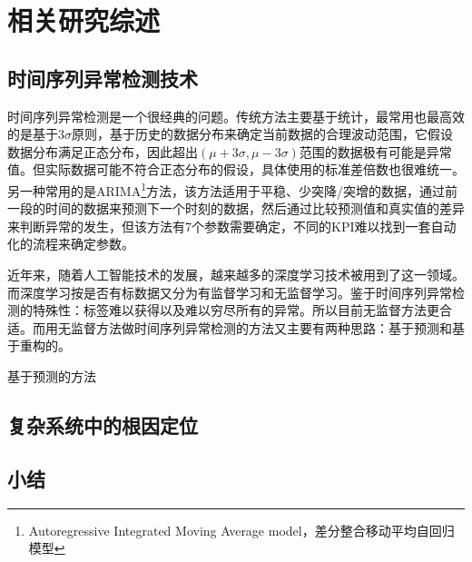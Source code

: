 
\chapter{相关研究综述}
\label{cha:intro}
\section{时间序列异常检测技术}
时间序列异常检测是一个很经典的问题。传统方法主要基于统计，最常用也最高效的是基于3$\sigma$原则，基于历史的数据分布来确定当前数据的合理波动范围，它假设数据分布满足正态分布，因此超出$(\mu + 3\sigma,\mu-3\sigma)$范围的数据极有可能是异常值。但实际数据可能不符合正态分布的假设，具体使用的标准差倍数也很难统一。另一种常用的是ARIMA\footnote{Autoregressive Integrated Moving Average model，差分整合移动平均自回归模型}方法，该方法适用于平稳、少突降/突增的数据，通过前一段的时间的数据来预测下一个时刻的数据，然后通过比较预测值和真实值的差异来判断异常的发生，但该方法有7个参数需要确定，不同的KPI难以找到一套自动化的流程来确定参数。

近年来，随着人工智能技术的发展，越来越多的深度学习技术被用到了这一领域。而深度学习按是否有标数据又分为有监督学习和无监督学习。鉴于时间序列异常检测的特殊性：标签难以获得以及难以穷尽所有的异常。所以目前无监督方法更合适。而用无监督方法做时间序列异常检测的方法又主要有两种思路：基于预测和基于重构的。

基于预测的方法

\section{复杂系统中的根因定位}
\section{小结}

